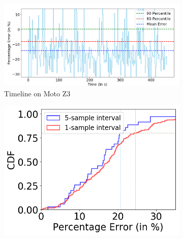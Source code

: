 \begin{figure}[tp]
    \centering
{}
\begin{subfigure}[b]{0.50\textwidth}
         \centering
         \includegraphics[width=\textwidth]{figures/sensor_error_timeline_5.png}
         \caption{Timeline on Moto Z3}
         \label{fig:sensor_error_timeline}
     \end{subfigure}
     \hfill
\fi

\begin{minipage}{0.48\columnwidth}
\begin{subfigure}[b]{\textwidth}
         \centering
         \includegraphics[width=\textwidth]{figures/sensor_error_cdf.png}
     \end{subfigure}
     

\end{minipage}
\end{figure}
